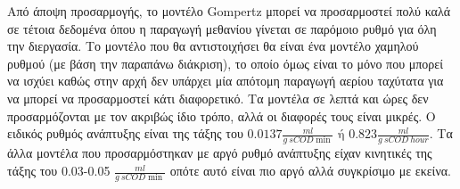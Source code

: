 \documentclass[11pt]{article}
\begin{document}
Από άποψη προσαρμογής, το μοντέλο Gompertz μπορεί να προσαρμοστεί πολύ καλά σε τέτοια δεδομένα όπου η παραγωγή μεθανίου γίνεται σε παρόμοιο ρυθμό για όλη την διεργασία. Το μοντέλο που θα αντιστοιχήσει θα είναι ένα μοντέλο χαμηλού ρυθμού (με βάση την παραπάνω διάκριση), το οποίο όμως είναι το μόνο που μπορεί να ισχύει καθώς στην αρχή δεν υπάρχει μία απότομη παραγωγή αερίου ταχύτατα για να μπορεί να προσαρμοστεί κάτι διαφορετικό. Τα μοντέλα σε λεπτά και ώρες δεν προσαρμόζονται με τον ακριβώς ίδιο τρόπο, αλλά οι διαφορές τους είναι μικρές. Ο ειδικός ρυθμός ανάπτυξης είναι της τάξης του \(0.0137 \frac{ml}{g ~ sCOD \min} \text{ ή } 0.823 \frac{ml}{g ~ sCOD ~ hour}\). Τα άλλα μοντέλα που προσαρμόστηκαν με αργό ρυθμό ανάπτυξης είχαν κινητικές της τάξης του 0.03-0.05 \(\frac{ml}{g ~ sCOD \min }\) οπότε αυτό είναι πιο αργό αλλά συγκρίσιμο με εκείνα.
\end{document}
